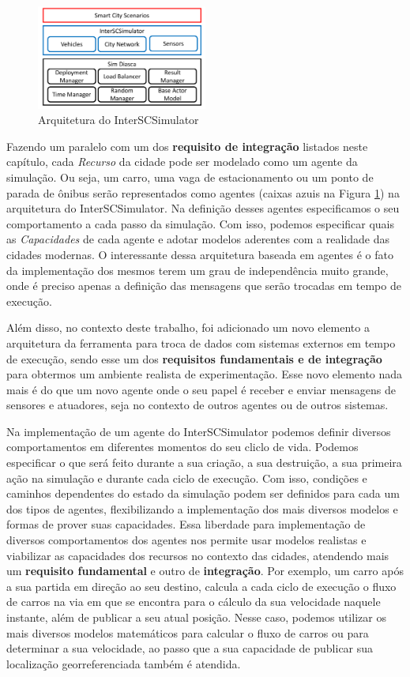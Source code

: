 \begin{figure}[ht]
	\centering
	\includegraphics[width=0.5\textwidth]{figuras/Arquitetura.pdf}
	\caption{Arquitetura do InterSCSimulator}
	\label{fig:simulator_architecture}
\end{figure}

Fazendo um paralelo com um dos \textbf{requisito de integração} listados neste capítulo, cada \textit{Recurso} da cidade pode ser modelado como um agente da simulação.
Ou seja, um carro, uma vaga de estacionamento ou um ponto de parada de ônibus serão representados como agentes (caixas azuis na Figura \ref{fig:simulator_architecture})
na arquitetura do InterSCSimulator.
Na definição desses agentes especificamos o seu comportamento a cada passo da simulação.
Com isso, podemos especificar quais as \textit{Capacidades} de cada agente e adotar modelos aderentes com a realidade das cidades modernas.
O interessante dessa arquitetura baseada em agentes é o fato da implementação dos mesmos terem um grau de independência muito grande, onde é preciso apenas a definição
das mensagens que serão trocadas em tempo de execução.

Além disso, no contexto deste trabalho, foi adicionado um novo elemento a arquitetura da ferramenta para troca de dados com sistemas externos em tempo de execução,
sendo esse um dos \textbf{requisitos fundamentais e de integração} para obtermos um ambiente realista de experimentação.
Esse novo elemento nada mais é do que um novo agente onde o seu papel é receber e enviar mensagens de sensores e atuadores, seja no contexto de outros agentes ou de
outros sistemas.

Na implementação de um agente do InterSCSimulator podemos definir diversos comportamentos em diferentes momentos do seu cliclo de vida.
Podemos especificar o que será feito durante a sua criação, a sua destruição, a sua primeira ação na simulação e durante cada ciclo de execução.
Com isso, condições e caminhos dependentes do estado da simulação podem ser definidos para cada um dos tipos de agentes, flexibilizando a implementação dos
mais diversos modelos e formas de prover suas capacidades.
Essa liberdade para implementação de diversos comportamentos dos agentes nos permite usar modelos realistas e viabilizar as capacidades dos recursos no contexto das cidades,
atendendo mais um \textbf{requisito fundamental} e outro de \textbf{integração}.
Por exemplo, um carro após a sua partida em direção ao seu destino, calcula a cada ciclo de execução o fluxo de carros na via em que se encontra para o cálculo da
sua velocidade naquele instante, além de publicar a seu atual posição.
Nesse caso, podemos utilizar os mais diversos modelos matemáticos para calcular o fluxo de carros ou para determinar a sua velocidade, ao passo que a sua capacidade
de publicar sua localização georreferenciada também é atendida.

